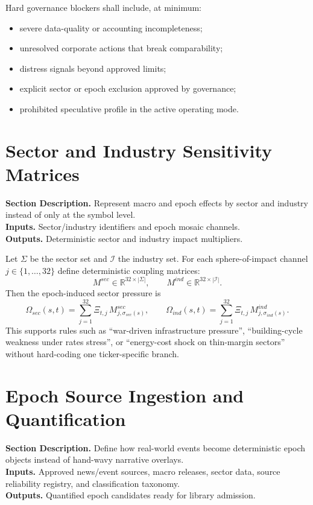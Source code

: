 \documentclass[11pt]{report}
\newcommand{\meta}[3]{\textbf{Section Description.} #1\\
\textbf{Inputs.} #2\\
\textbf{Outputs.} #3\par}
\begin{document}
Hard governance blockers shall include, at minimum:
\begin{itemize}
\item severe data-quality or accounting incompleteness;
\item unresolved corporate actions that break comparability;
\item distress signals beyond approved limits;
\item explicit sector or epoch exclusion approved by governance;
\item prohibited speculative profile in the active operating mode.
\end{itemize}

\section{Sector and Industry Sensitivity Matrices}
\meta{Represent macro and epoch effects by sector and industry instead of only at the symbol level.}{Sector/industry identifiers and epoch mosaic channels.}{Deterministic sector and industry impact multipliers.}

Let $\Sigma$ be the sector set and $\mathcal{I}$ the industry set. For each sphere-of-impact channel $j\in\{1,\dots,32\}$ define deterministic coupling matrices:
\[
M^{sec}\in\mathbb{R}^{32\times |\Sigma|},\qquad M^{ind}\in\mathbb{R}^{32\times |\mathcal{I}|}.
\]
Then the epoch-induced sector pressure is
\[
\Omega_{sec}(s,t)=\sum_{j=1}^{32}\Xi_{t,j}\,M^{sec}_{j,\sigma_{sec}(s)},
\qquad
\Omega_{ind}(s,t)=\sum_{j=1}^{32}\Xi_{t,j}\,M^{ind}_{j,\sigma_{ind}(s)}.
\]
This supports rules such as ``war-driven infrastructure pressure'', ``building-cycle weakness under rates stress'', or ``energy-cost shock on thin-margin sectors'' without hard-coding one ticker-specific branch.


\section{Epoch Source Ingestion and Quantification}
\meta{Define how real-world events become deterministic epoch objects instead of hand-wavy narrative overlays.}{Approved news/event sources, macro releases, sector data, source reliability registry, and classification taxonomy.}{Quantified epoch candidates ready for library admission.}
\end{document}
